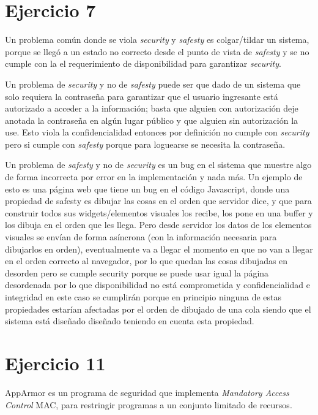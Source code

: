 \documentclass[12pt]{article}%
\begin{document}
\section*{Ejercicio 7}

Un problema común donde se viola \textit{security} y \textit{safesty}
es colgar/tildar un sistema, porque se llegó a un estado no correcto
desde el punto de vista de \textit{safesty} y se no cumple con la el
requerimiento de disponibilidad para garantizar \textit{security}.

Un problema de \textit{security} y no de \textit{safesty} puede ser
que dado de un sistema que solo requiera la contraseña para garantizar
que el usuario ingresante está autorizado a acceder a la
información; basta que alguien con autorización deje anotada la
contraseña en algún lugar público y que alguien sin autorización la
use. Esto viola la confidencialidad entonces por definición no cumple
con \textit{security} pero si cumple con \textit{safesty} porque para
loguearse se necesita la contraseña.

Un problema de \textit{safesty} y no de \textit{security} es un bug en
el sistema que muestre algo de forma incorrecta por error en la
implementación y nada más. Un ejemplo de esto es una página web que
tiene un bug en el código Javascript, donde una propiedad de safesty
es dibujar las cosas en el orden que servidor dice, y que para
construir todos sus widgets/elementos visuales los recibe, los pone en
una buffer y los dibuja en el orden que les llega. Pero desde servidor
los datos de los elementos visuales se envían de forma asíncrona (con
la información necesaria para dibujarlos en orden), eventualmente va a
llegar el momento en que no van a llegar en el orden correcto al
navegador, por lo que quedan las cosas dibujadas en desorden pero se
cumple security porque se puede usar igual la página desordenada por
lo que disponibilidad no está comprometida y confidencialidad e
integridad en este caso se cumplirán porque en principio ninguna de
estas propiedades estarían afectadas por el orden de dibujado de una
cola siendo que el sistema está diseñado diseñado teniendo en cuenta
esta propiedad.

\section*{Ejercicio 11}
AppArmor es un programa de seguridad que implementa \textit{Mandatory
  Access Control} MAC, para restringir programas a un conjunto
limitado de recursos.
\end{document}

